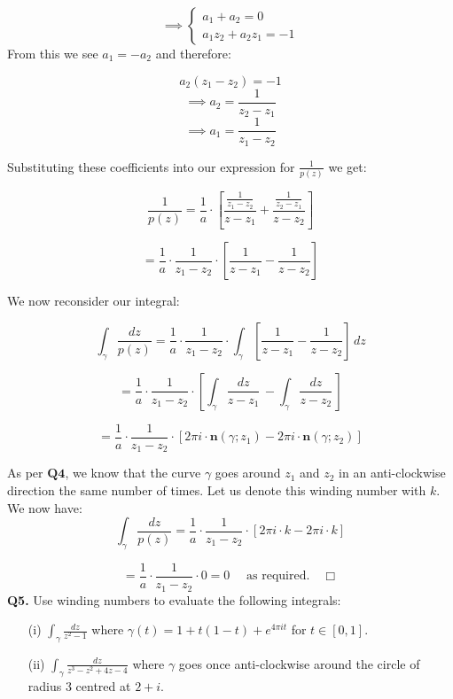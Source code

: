 \documentclass[12pt]{article}
\begin{document}
\[ \implies
\left\{
\begin{array}{ll}
a_1 + a_2 = 0 \\
a_1z_2 + a_2z_1 = -1
\end{array}
\right.
\]
\[\]
\noindent From this we see \(a_1 = -a_2\) and therefore:

\[
a_2\left(z_1-z_2\right) = -1
\]
\[
\implies a_2 = \frac{1}{z_2-z_1}
\]
\[
\implies a_1 = \frac{1}{z_1-z_2}
\]

\noindent Substituting these coefficients into our expression for \(\frac{1}{p(z)}\) we get:

\[
    \frac{1}{p(z)}=  \frac{1}{a} \cdot \left[\frac{\frac{1}{z_1-z_2}}{z-z_1} + \frac{\frac{1}{z_2-z_1}}{z-z_2} \right]
\]

\[
= \frac{1}{a} \cdot \frac{1}{z_1-z_2} \cdot \left[\frac{1}{z-z_1} - \frac{1}{z-z_2}\right]
\]

\noindent We now reconsider our integral:

\[
    \int_{\gamma} \frac{dz}{p(z)} =\frac{1}{a} \cdot \frac{1}{z_1-z_2} \cdot \int_{\gamma} \left[\frac{1}{z-z_1} - \frac{1}{z-z_2}\right] \, dz
\]

\[
= \frac{1}{a} \cdot \frac{1}{z_1-z_2} \cdot \left[\int_{\gamma} \frac{dz}{z-z_1} \,  - \int_{\gamma} \frac{dz}{z-z_2} \,  \right]
\]

\[
= \frac{1}{a} \cdot \frac{1}{z_1-z_2} \cdot \left[2\pi i \cdot \mathbf{n}\left(\gamma ;z_1\right)  - 2\pi i \cdot \mathbf{n}\left(\gamma ;z_2\right)\right]
\]

\noindent As per \(\textbf{Q4}\), we know that the curve \(\gamma\) goes around \(z_1\) and \(z_2\) in an anti-clockwise direction the same number of times. Let us denote this winding number with \(k\).\newline
\linebreak
\noindent We now have: 
\[
    \int_{\gamma} \frac{dz}{p(z)} = \frac{1}{a} \cdot \frac{1}{z_1-z_2} \cdot \left[2\pi i \cdot k - 2\pi i \cdot k\right]
\]

\[
    = \frac{1}{a} \cdot \frac{1}{z_1-z_2} \cdot 0 = 0 \quad \text{ as required.} \quad \Box
\]
\[\]
\textbf{Q5.} Use winding numbers to evaluate the following integrals:
\begin{itemize}
    \item[(i)] \(\int_{\gamma} \frac{dz}{z^2 - 1}\) where \(\gamma(t) = 1 + t(1 - t) + e^{4\pi it}\) for \(t \in [0, 1]\).
    \item[(ii)] \(\int_{\gamma} \frac{dz}{z^3 - z^2 + 4z - 4}\) where \(\gamma\) goes once anti-clockwise around the circle of radius 3 centred at \(2 + i\).
\end{itemize}
\end{document}

